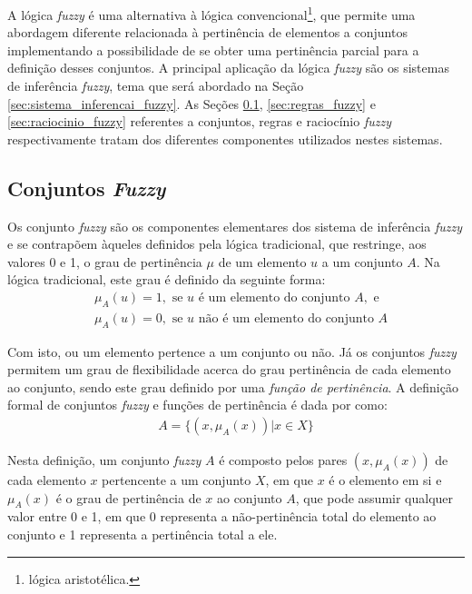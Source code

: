 A lógica \textit{fuzzy} é uma alternativa à lógica convencional\footnote{lógica aristotélica.}, que permite uma abordagem diferente relacionada à pertinência de elementos a conjuntos implementando a possibilidade de se obter uma pertinência parcial para a definição desses conjuntos. A principal aplicação da lógica \textit{fuzzy} são os sistemas de inferência \textit{fuzzy}, tema que será abordado na Seção \ref{sec:sistema_inferencai_fuzzy}. As Seções \ref{sec:cojuntos_fuzzy}, \ref{sec:regras_fuzzy} e \ref{sec:raciocinio_fuzzy} referentes a conjuntos, regras e raciocínio \textit{fuzzy} respectivamente tratam dos diferentes componentes utilizados nestes sistemas. 

\subsection{Conjuntos \textit{Fuzzy}}
\label{sec:cojuntos_fuzzy}

Os conjunto \textit{fuzzy} são os componentes elementares dos sistema de inferência \textit{fuzzy} e se contrapõem àqueles definidos pela lógica tradicional, que restringe, aos valores 0 e 1, o grau de pertinência $\mu$ de um elemento $u$ a um conjunto $A$. Na lógica tradicional, este grau é definido da seguinte forma:
\begin{align*}
&\mu_A(u) = 1, \mbox{ se } u \mbox{ é um elemento do conjunto } A, \mbox{ e }\\
&\mu_A(u) = 0, \mbox{ se } u \mbox{ não é um elemento do conjunto } A
\end{align*}

Com isto, ou um elemento pertence a um conjunto ou não. Já os conjuntos \textit{fuzzy} permitem um grau de flexibilidade acerca do grau pertinência de cada elemento ao conjunto, sendo este grau definido por uma \textit{função de pertinência}. A definição formal de conjuntos \textit{fuzzy} e funções de pertinência é dada por  como:
\begin{align*}
	A = \{(x,\mu_A(x)) \vert x \in X\}
\end{align*}

Nesta definição, um conjunto \textit{fuzzy} $A$ é composto pelos pares $(x,\mu_A(x))$ de cada elemento $x$ pertencente a um conjunto $X$, em que $x$ é o elemento em si e $\mu_A(x)$ é o grau de pertinência de $x$ ao conjunto $A$, que pode assumir qualquer valor entre 0 e 1, em que 0 representa a não-pertinência total do elemento ao conjunto e 1 representa a pertinência total a ele.

